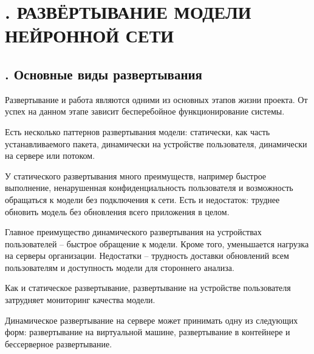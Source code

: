 \setcounter{chaptercntr}{5}

\sectionbreak \section*{
	\gostTitleFont
	\redline
	\thechaptercntr .
	РАЗВЁРТЫВАНИЕ МОДЕЛИ НЕЙРОННОЙ СЕТИ
}

\titlespace

\subsection*{ 
	\gostTitleFont
	\redline
	\thechaptercntr .\thesubchaptercntr \spc
	Основные виды развертывания
} \addtocounter{subchaptercntr}{1}

\subtitlespace

{\gostFont

	\par \redline Развертывание и работа являются одними из основных этапов жизни проекта. От успех на данном этапе зависит бесперебойное функционирование системы.

	\par \redline Есть несколько паттернов развертывания модели: статически, как часть устанавливаемого пакета, динамически на устройстве пользователя, динамически на сервере или потоком.

	\par \redline У статического развертывания много преимуществ, например быстрое выполнение, ненарушенная конфиденциальность пользователя и возможность обращаться к модели без подключения к сети. Есть и недостаток: труднее обновить модель без обновления всего приложения в целом.

	\par \redline Главное преимущество динамического развертывания на устройствах пользователей {--} быстрое обращение к модели. Кроме того, уменьшается нагрузка на серверы организации. Недостатки – трудность доставки обновлений всем пользователям и доступность модели для стороннего анализа.

	\par \redline Как и статическое развертывание, развертывание на устройстве пользователя затрудняет мониторинг качества модели.

	\par \redline Динамическое развертывание на сервере может принимать одну из следующих форм: развертывание на виртуальной машине, развертывание в контейнере и бессерверное развертывание.

}
